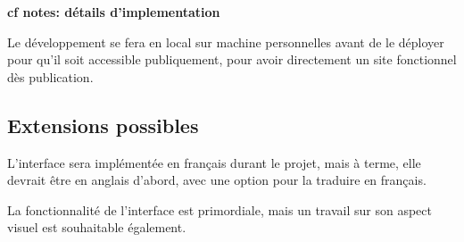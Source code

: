 \textbf{cf notes: détails d'implementation}

Le développement se fera en local sur machine personnelles
avant de le déployer pour qu'il soit accessible publiquement,
pour avoir directement un site fonctionnel dès publication.


\subsection{Extensions possibles}

L'interface sera implémentée en français durant le projet,
mais à terme, elle devrait être en anglais d'abord,
avec une option pour la traduire en français.

La fonctionnalité de l'interface est primordiale,
mais un travail sur son aspect visuel est souhaitable également.
